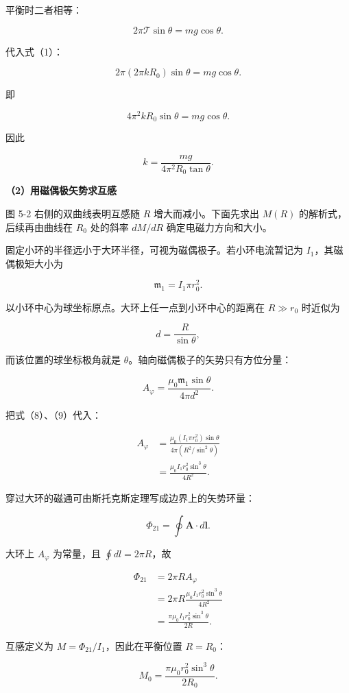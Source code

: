 \documentclass[12pt,a4paper,UTF8]{ctexart}
\begin{document}
平衡时二者相等：

\[2\pi\mathcal T\sin\theta=mg\cos\theta.\]

代入式（1）：

\[2\pi(2\pi kR_0)\sin\theta=mg\cos\theta.\]

即

\[4\pi^2kR_0\sin\theta=mg\cos\theta.\]

因此

\[\boxed{k=\frac{mg}{4\pi^2R_0\tan\theta}}.\]

\textbf{（2）用磁偶极矢势求互感}

图 5-2 右侧的双曲线表明互感随 \(R\) 增大而减小。下面先求出 \(M(R)\)
的解析式，后续再由曲线在 \(R_0\) 处的斜率 \(dM/dR\)
确定电磁力方向和大小。

固定小环的半径远小于大环半径，可视为磁偶极子。若小环电流暂记为
\(I_1\)，其磁偶极矩大小为

\[\mathfrak m_1=I_1\pi r_0^2.\]

以小环中心为球坐标原点。大环上任一点到小环中心的距离在 \(R\gg r_0\)
时近似为

\[d=\frac{R}{\sin\theta},\]

而该位置的球坐标极角就是 \(\theta\)。轴向磁偶极子的矢势只有方位分量：

\[A_\varphi=\frac{\mu_0\mathfrak m_1\sin\theta}{4\pi d^2}.\]

把式（8）、（9）代入：

\[\begin{aligned}
A_\varphi
&=\frac{\mu_0(I_1\pi r_0^2)\sin\theta}
{4\pi(R^2/\sin^2\theta)}\\
&=\frac{\mu_0I_1r_0^2\sin^3\theta}{4R^2}.
\end{aligned}\]

穿过大环的磁通可由斯托克斯定理写成边界上的矢势环量：

\[\Phi_{21}=\oint\bm A\cdot d\bm l.\]

大环上 \(A_\varphi\) 为常量，且 \(\oint dl=2\pi R\)，故

\[\begin{aligned}
\Phi_{21}
&=2\pi R A_\varphi\\
&=2\pi R\frac{\mu_0I_1r_0^2\sin^3\theta}{4R^2}\\
&=\frac{\pi\mu_0I_1r_0^2\sin^3\theta}{2R}.
\end{aligned}\]

互感定义为 \(M=\Phi_{21}/I_1\)，因此在平衡位置 \(R=R_0\)：

\[\boxed{M_0=\frac{\pi\mu_0r_0^2\sin^3\theta}{2R_0}}.\]
\end{document}
